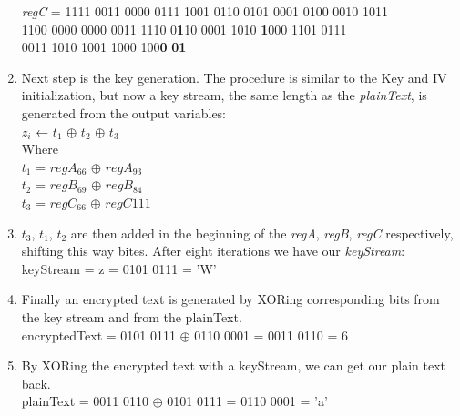 \begin{enumerate}
{		\emph{regC} = 1111 0011 0000 0111 1001 0110 0101 0001 0100 0010 1011 \\ 
		\indent\hspace{1.6cm}1100 0000 0000 0011 1110 0\textbf{1}10 0001 1010 \textbf{1}000 1101 0111 \\
		\indent\hspace{1.6cm}0011 1010 1001 1000 100\textbf{0} \textbf{01}
	}
	\item Next step is the key generation. The procedure is similar to the Key and IV initialization, but now a key stream, the same length as the \emph{plainText}, is generated from the output variables:\\
	{\selectfont
		$z_i$ ← $t_1$ $\oplus$ $t_2$ $\oplus$ $t_3$\\
		Where \\
		$t_1$ = $regA_{66}$ $\oplus$ $regA_{93}$\\
		$t_2$ = $regB_{69}$ $\oplus$ $regB_{84}$\\
		$t_3$ = $regC_{66}$ $\oplus$ $regC{111}$
	}
	\item \emph{$t_3$}, \emph{$t_1$}, \emph{$t_2$} are then added in the beginning of the \emph{regA}, \emph{regB}, \emph{regC} respectively, shifting this way bites. After eight iterations we have our \emph{keyStream}:\\
	{\selectfont
		keyStream  = z = 0101 0111 = 'W'
	}
	\item Finally an encrypted text is generated by XORing corresponding bits from the key stream and from the plainText.\\
	{\selectfont
		encryptedText = 0101 0111 $\oplus$ 0110 0001 = 0011 0110 = 6
	}
	\item By XORing the encrypted text with a keyStream, we can get our plain text back.\\
	{\selectfont
		plainText = 0011 0110 $\oplus$ 0101 0111 = 0110 0001 = 'a'
	}
\end{enumerate}

